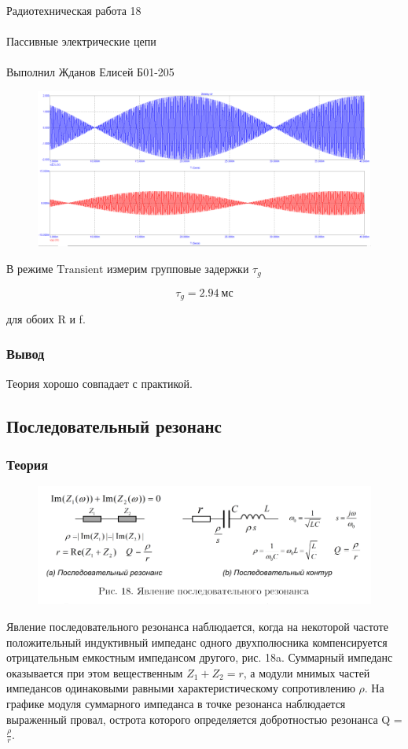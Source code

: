 \documentclass{astroedu-lab}
\begin{document}
\begin{problem}{\huge Радиотехническая работа 18\\\\Пассивные электрические цепи\\\\Выполнил Жданов Елисей Б01-205}
\begin{figure}[!h]
	\centering
	\includegraphics[width=1\textwidth]{3_12.png}
	\label{fig:boiler}
\end{figure}

В режиме $\text{Transient}$ измерим групповые задержки $\tau_g$

\[\tau_g = 2.94 \: \text{мс}\]

для обоих R и f.

\subsubsection{Вывод}

Теория хорошо совпадает с практикой.

\subsection{Последовательный резонанс}

\subsubsection{Теория}

\begin{figure}[!h]
	\centering
	\includegraphics[width=1\textwidth]{4_1.png}
	\label{fig:boiler}
\end{figure}

Явление последовательного резонанса наблюдается, когда на некоторой частоте положительный индуктивный импеданс одного двухполюсника компенсируется отрицательным емкостным импедансом другого, рис. 18a. Суммарный импеданс оказывается при этом вещественным $Z_1 + Z_2 = r$, а модули мнимых частей импедансов одинаковыми равными характеристическому сопротивлению $\rho$. На графике модуля суммарного импеданса в точке резонанса наблюдается выраженный провал, острота которого определяется добротностью резонанса Q = $\frac{\rho}{r}$.


\end{problem}
\end{document}

